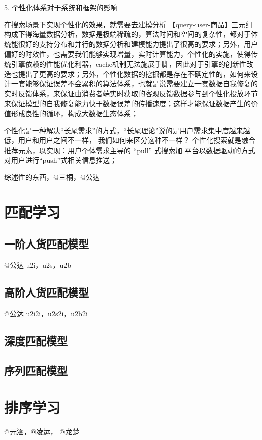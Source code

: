 5. 个性化体系对于系统和框架的影响

在搜索场景下实现个性化的效果，就需要去建模分析 【query-user-商品】三元组构成下得海量数据分析，数据是极端稀疏的，算法时间和空间的复杂性，都对于体统能很好的支持分布和并行的数据分析和建模能力提出了很高的要求；另外，用户偏好的时效性，也需要我们能够实现增量，实时计算能力，个性化的实施，使得传统引擎依赖的性能优化利器，cache机制无法施展手脚，因此对于引擎的创新性改造也提出了更高的要求；另外，个性化数据的挖掘都是存在不确定性的，如何来设计一套能够保证误差不会累积的算法体系，也就是说需要建立一套数据自我修复的实时反馈体系，来保证由消费者端实时获取的客观反馈数据参与到个性化投放环节来保证模型的自我修复能力快于数据误差的传播速度；这样才能保证数据产生的价值形成良性的循环，构成大数据生态体系；



个性化是一种解决“长尾需求”的方式，“长尾理论”说的是用户需求集中度越来越低，用户和用户之间不一样，
我们如何来区分这种不一样？ 个性化搜索就是融合推荐元素，以实现：用户个体需求主导的 “pull” 式搜索加
平台以数据驱动的方式对用户进行“push”式相关信息推送；


综述性的东西，@三桐，@公达

\section{匹配学习}
	
\subsection{一阶人货匹配模型} 
	@公达 u2i，u2s，u2b 

\subsection{高阶人货匹配模型} 
	@公达 u2i2i，u2s2i，u2b2i 

\subsection{深度匹配模型} 

\subsection{序列匹配模型} 
	
\section{排序学习}
	@元涵，@凌运， @龙楚
\subsection{}

